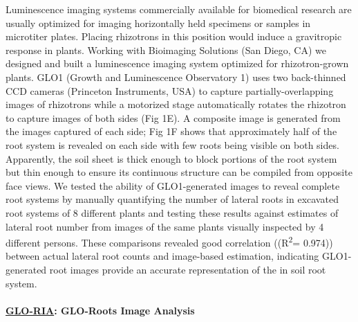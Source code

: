 \documentclass[]{article}
\begin{document}
Luminescence imaging systems commercially available for biomedical
research are usually optimized for imaging horizontally held specimens
or samples in microtiter plates. Placing rhizotrons in this position
would induce a gravitropic response in plants. Working with Bioimaging
Solutions (San Diego, CA) we designed and built a luminescence imaging
system optimized for rhizotron-grown plants. GLO1 (Growth and
Luminescence Observatory 1) uses two back-thinned CCD cameras (Princeton
Instruments, USA) to capture partially-overlapping images of rhizotrons
while a motorized stage automatically rotates the rhizotron to capture
images of both sides (Fig 1E). A composite image is generated from the
images captured of each side; Fig 1F shows that approximately half of
the root system is revealed on each side with few roots being visible on
both sides. Apparently, the soil sheet is thick enough to block portions
of the root system but thin enough to ensure its continuous structure
can be compiled from opposite face views. We tested the ability of
GLO1-generated images to reveal complete root systems by manually
quantifying the number of lateral roots in excavated root systems of 8
different plants and testing these results against estimates of lateral
root number from images of the same plants visually inspected by 4
different persons. These comparisons revealed good correlation
((R\textsuperscript{2}= 0.974)) between actual lateral root counts and
image-based estimation, indicating GLO1-generated root images provide an
accurate representation of the in soil root system.

\paragraph{\texorpdfstring{\href{https://github.com/rr-lab/GLO-Roots/blob/master/gloria/GLORIA/manual/GLO_RIA_manual.md}{GLO-RIA}:
GLO-Roots Image
Analysis}{GLO-RIA: GLO-Roots Image Analysis}}\label{glo-ria-glo-roots-image-analysis}
\end{document}
